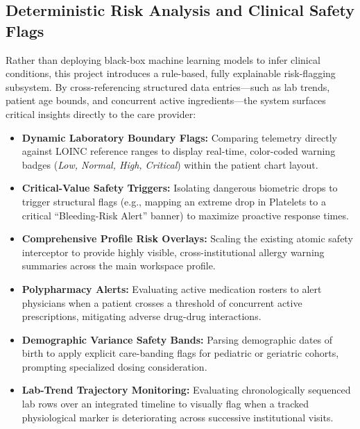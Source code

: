 \documentclass[12pt, a4paper]{report}
\numberwithin{equation}{chapter}
\begin{document}
\subsection{Deterministic Risk Analysis and Clinical Safety Flags}
Rather than deploying black-box machine learning models to infer clinical conditions, this project introduces a rule-based, fully explainable risk-flagging subsystem. By cross-referencing structured data entries—such as lab trends, patient age bounds, and concurrent active ingredients—the system surfaces critical insights directly to the care provider:
\begin{itemize}
    \item \textbf{Dynamic Laboratory Boundary Flags:} Comparing telemetry directly against LOINC reference ranges to display real-time, color-coded warning badges (\textit{Low, Normal, High, Critical}) within the patient chart layout.
    \item \textbf{Critical-Value Safety Triggers:} Isolating dangerous biometric drops to trigger structural flags (e.g., mapping an extreme drop in Platelets to a critical ``Bleeding-Risk Alert'' banner) to maximize proactive response times.
    \item \textbf{Comprehensive Profile Risk Overlays:} Scaling the existing atomic safety interceptor to provide highly visible, cross-institutional allergy warning summaries across the main workspace profile.
    \item \textbf{Polypharmacy Alerts:} Evaluating active medication rosters to alert physicians when a patient crosses a threshold of concurrent active prescriptions, mitigating adverse drug-drug interactions.
    \item \textbf{Demographic Variance Safety Bands:} Parsing demographic dates of birth to apply explicit care-banding flags for pediatric or geriatric cohorts, prompting specialized dosing consideration.
    \item \textbf{Lab-Trend Trajectory Monitoring:} Evaluating chronologically sequenced lab rows over an integrated timeline to visually flag when a tracked physiological marker is deteriorating across successive institutional visits.
\end{itemize}
\end{document}
